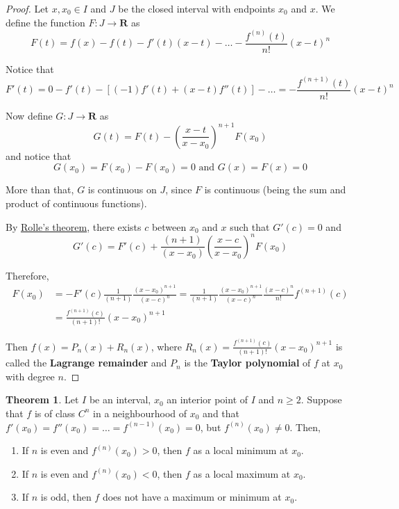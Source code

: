 \documentclass[tikz,12pt,a4paper]{article}
\theoremstyle{definition}
\newtheorem{theorem}{Theorem}[section]
\begin{document}
\begin{proof}
	Let $x, x_0 \in I$ and $J$ be the closed interval with endpoints $x_0$ and $x$. We define the function $F : J \longrightarrow \textbf{R}$ as 
	\[
		F(t) = f(x) - f(t) - f'(t)(x-t) - \ldots - \frac{f^{(n)}(t)}{n!} (x-t)^n
	\]

	Notice that
	\[
		F'(t) = 0 - f'(t) - [(-1)f'(t) + (x-t) f''(t)] - \ldots = - \frac{f^{(n+1)}(t)}{n!} (x - t)^n
	\]

	Now define $G : J \longrightarrow \textbf{R}$ as
	\[
		G(t) = F(t) - \left( \frac{x-t}{x - x_0} \right)^{n+1} F(x_0)
	\]
	and notice that 
	\[
		G(x_0) = F(x_0) - F(x_0) = 0 \text{ and } G(x) = F(x) = 0
	\]

	More than that, $G$ is continuous on $J$, since $F$ is continuous (being the sum and product of continuous functions).

	By \hyperref[thm:rolle]{Rolle's theorem}, there exists $c$ between $x_0$ and $x$ such that $G'(c) = 0$ and
	\[
		G'(c) = F'(c) + \frac{(n+1)}{(x - x_0)} \left( \frac{x-c}{x - x_0} \right)^{n} F(x_0)
	\]

	Therefore,
	\begin{equation*}
		\begin{aligned}
			F(x_0) &= - F'(c) \frac{1}{(n+1)} \frac{(x - x_0)^{n+1}}{(x - c)^n} = \frac{1}{(n+1)} \frac{(x - x_0)^{n+1}}{(x - c)^n} \frac{(x - c)^n}{n!} f^{(n+1)}(c) \\
			&= \frac{f^{(n+1)}(c)}{(n+1)!} (x - x_0)^{n+1}
		\end{aligned}
	\end{equation*}

	Then $f(x) = P_n(x) + R_n(x)$, where $R_n(x) = \frac{f^{(n+1)}(c)}{(n+1)!} (x - x_0)^{n+1}$ is called the \textbf{Lagrange remainder} and $P_n$ is the \textbf{Taylor polynomial} of $f$ at $x_0$ with degree $n$.
\end{proof}

\begin{theorem}
	Let $I$ be an interval, $x_0$ an interior point of $I$ and $ n \geq 2 $. Suppose that $f$ is of class $C^n$ in a neighbourhood of $x_0$ and that $f'(x_0) = f''(x_0) = \ldots = f^{(n-1)}(x_0) = 0$, but $f^{(n)}(x_0) \neq 0$. Then,
	\begin{enumerate}
		\item If $n$ is even and $f^{(n)}(x_0) > 0$, then $f$ as a local minimum at $x_0$.
		\item If $n$ is even and $f^{(n)}(x_0) < 0$, then $f$ as a local maximum at $x_0$.
		\item If $n$ is odd, then $f$ does not have a maximum or minimum at $x_0$.
	\end{enumerate}
\end{theorem}
\end{document}
